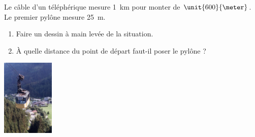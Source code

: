 
\begin{exercice}\label{exo2smath-0152}

    \begin{multicols}{2}
        Le câble d'un téléphérique mesure \SI{1}{\kilo\meter}  pour monter de \( \unit{600}{\meter}\). Le premier pylône mesure \SI{25}{\meter}.
    \begin{enumerate}
        \item
            Faire un dessin à main levée de la situation.
        \item
    À quelle distance du point de départ faut-il poser le pylône ?
    \end{enumerate}

    \columnbreak
    \includegraphics[width=2.5cm]{telepherique.pdf}
    \end{multicols}

\end{exercice}
